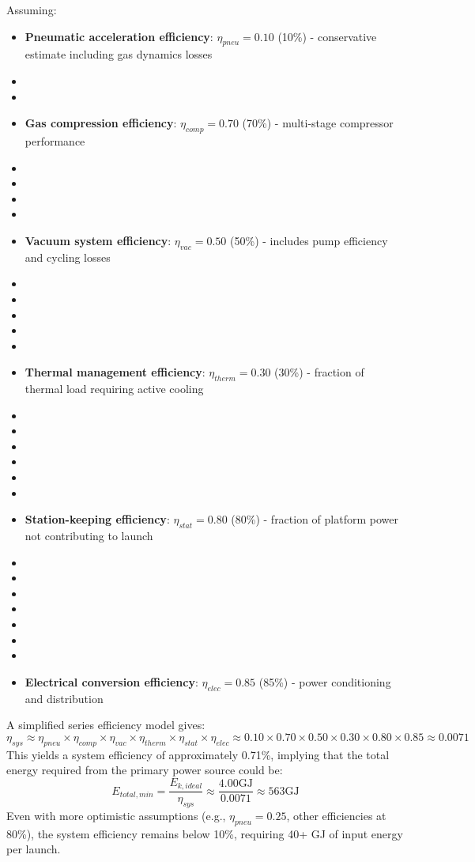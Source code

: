 Assuming:
\begin{itemize}
    \item \textbf{Pneumatic acceleration efficiency}: $\eta_{pneu} = 0.10$ (10\%) - conservative estimate including gas dynamics losses
    \item \item \item \textbf{Gas compression efficiency}: $\eta_{comp} = 0.70$ (70\%) - multi-stage compressor performance
    \item \item \item \item \item \textbf{Vacuum system efficiency}: $\eta_{vac} = 0.50$ (50\%) - includes pump efficiency and cycling losses
    \item \item \item \item \item \item \textbf{Thermal management efficiency}: $\eta_{therm} = 0.30$ (30\%) - fraction of thermal load requiring active cooling
    \item \item \item \item \item \item \item \textbf{Station-keeping efficiency}: $\eta_{stat} = 0.80$ (80\%) - fraction of platform power not contributing to launch
    \item \item \item \item \item \item \item \item \textbf{Electrical conversion efficiency}: $\eta_{elec} = 0.85$ (85\%) - power conditioning and distribution
\end{itemize}
A simplified series efficiency model gives:
\begin{equation}
\eta_{sys} \approx \eta_{pneu} \times \eta_{comp} \times \eta_{vac} \times \eta_{therm} \times \eta_{stat} \times \eta_{elec} \approx 0.10 \times 0.70 \times 0.50 \times 0.30 \times 0.80 \times 0.85 \approx 0.0071
\end{equation}
This yields a system efficiency of approximately 0.71\%, implying that the total energy required from the primary power source could be:
\begin{equation}
E_{total,min} = \frac{E_{k,ideal}}{\eta_{sys}} \approx \frac{4.00  \text{GJ}}{0.0071} \approx 563  \text{GJ}
\end{equation}
Even with more optimistic assumptions (e.g., $\eta_{pneu} = 0.25$, other efficiencies at 80\%), the system efficiency remains below 10\%, requiring 40+ GJ of input energy per launch.

